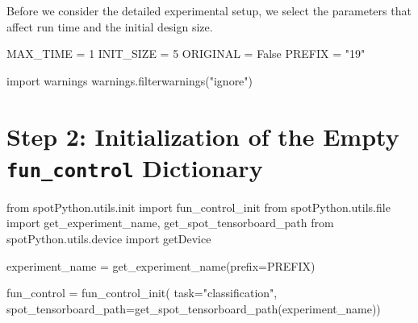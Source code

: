 \documentclass[
  letterpaper,
  DIV=11,
  numbers=noendperiod]{scrreprt}
\newenvironment{Shaded}{\begin{snugshade}}{\end{snugshade}}
\newcommand{\BuiltInTok}[1]{\textcolor[rgb]{0.00,0.23,0.31}{#1}}
\newcommand{\DecValTok}[1]{\textcolor[rgb]{0.68,0.00,0.00}{#1}}
\newcommand{\ImportTok}[1]{\textcolor[rgb]{0.00,0.46,0.62}{#1}}
\newcommand{\NormalTok}[1]{\textcolor[rgb]{0.00,0.23,0.31}{#1}}
\newcommand{\OperatorTok}[1]{\textcolor[rgb]{0.37,0.37,0.37}{#1}}
\newcommand{\StringTok}[1]{\textcolor[rgb]{0.13,0.47,0.30}{#1}}
\newcommand{\VariableTok}[1]{\textcolor[rgb]{0.07,0.07,0.07}{#1}}
\begin{document}
Before we consider the detailed experimental setup, we select the
parameters that affect run time and the initial design size.

\begin{Shaded}
\begin{Highlighting}[]
\NormalTok{MAX\_TIME }\OperatorTok{=} \DecValTok{1}
\NormalTok{INIT\_SIZE }\OperatorTok{=} \DecValTok{5}
\NormalTok{ORIGINAL }\OperatorTok{=} \VariableTok{False}
\NormalTok{PREFIX }\OperatorTok{=} \StringTok{"19"}
\end{Highlighting}
\end{Shaded}

\begin{Shaded}
\begin{Highlighting}[]
\ImportTok{import}\NormalTok{ warnings}
\NormalTok{warnings.filterwarnings(}\StringTok{"ignore"}\NormalTok{)}
\end{Highlighting}
\end{Shaded}

\hypertarget{step-2-initialization-of-the-empty-fun_control-dictionary-4}{%
\section{\texorpdfstring{Step 2: Initialization of the Empty
\texttt{fun\_control}
Dictionary}{Step 2: Initialization of the Empty fun\_control Dictionary}}\label{step-2-initialization-of-the-empty-fun_control-dictionary-4}}

\begin{Shaded}
\begin{Highlighting}[]
\ImportTok{from}\NormalTok{ spotPython.utils.init }\ImportTok{import}\NormalTok{ fun\_control\_init}
\ImportTok{from}\NormalTok{ spotPython.utils.}\BuiltInTok{file} \ImportTok{import}\NormalTok{ get\_experiment\_name, get\_spot\_tensorboard\_path}
\ImportTok{from}\NormalTok{ spotPython.utils.device }\ImportTok{import}\NormalTok{ getDevice}

\NormalTok{experiment\_name }\OperatorTok{=}\NormalTok{ get\_experiment\_name(prefix}\OperatorTok{=}\NormalTok{PREFIX)}

\NormalTok{fun\_control }\OperatorTok{=}\NormalTok{ fun\_control\_init(}
\NormalTok{    task}\OperatorTok{=}\StringTok{"classification"}\NormalTok{,}
\NormalTok{    spot\_tensorboard\_path}\OperatorTok{=}\NormalTok{get\_spot\_tensorboard\_path(experiment\_name))}
\end{Highlighting}
\end{Shaded}
\end{document}
